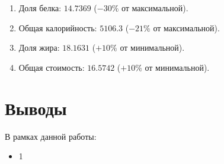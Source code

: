 \begin{enumerate}
	\item Доля белка: $14.7369$ ($-30\%$ от максимальной).
	\item Общая калорийность: $5106.3$ ($-21\%$ от максимальной).
	\item Доля жира: $18.1631$ ($+10\%$ от минимальной).
	\item Общая стоимость: $16.5742$ ($+10\%$ от минимальной).
\end{enumerate}

\section{Выводы}

В рамках данной работы:

\begin{itemize}
	\item 1
\end{itemize}



